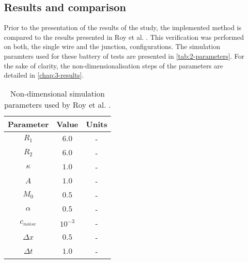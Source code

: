 \subsection{Results and comparison}
    Prior to the presentation of the results of the study, the implemented method is compared to the results presented in Roy et al. \cite{RoyVarmaGururajan2021}. This verification was performed on both, the single wire and the junction, configurations. The simulation paramters used for these battery of tests are presented in \autoref{tab:2-parameters}. For the sake of clarity, the non-dimensionalisation steps of the parameters are detailed in \autoref{chap:3-results}.
    \begin{table}[H]
        \centering
        \begin{tabular}{ccc}
            \hline
            Parameter & Value & Units\\
            \hline
            $R_1$ & $6.0$ & -\\
            $R_2$ & $6.0$ & -\\
            $\kappa$ & $1.0$ & -\\
            $A$ & $1.0$ & - \\
            $M_0$ & $0.5$ & - \\
            $\alpha$ & $0.5$ & -\\
            $c_{noise}$ & $10^{-3}$ & -\\
            $\Delta x$ & $0.5$ & -\\
            $\Delta t$ & $1.0$ & -\\
            \hline
        \end{tabular}
        \caption{Non-dimensional simulation parameters used by Roy et al. \cite{RoyVarmaGururajan2021}.}
        \label{tab:2-parameters}
    \end{table}
